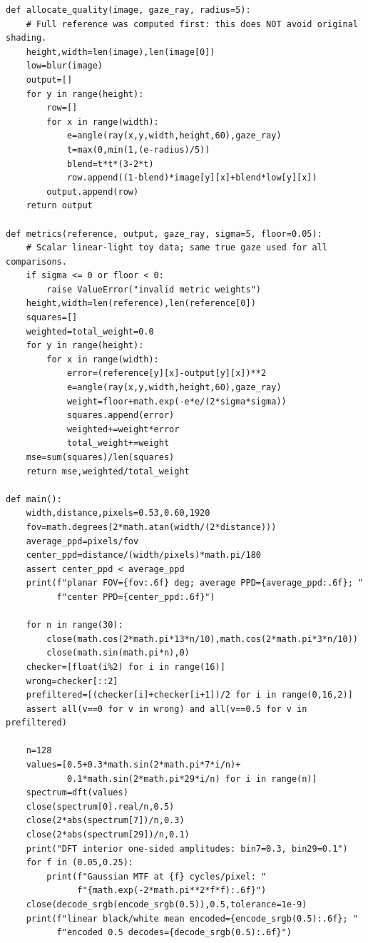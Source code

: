 \begin{verbatim}
def allocate_quality(image, gaze_ray, radius=5):
    # Full reference was computed first: this does NOT avoid original shading.
    height,width=len(image),len(image[0])
    low=blur(image)
    output=[]
    for y in range(height):
        row=[]
        for x in range(width):
            e=angle(ray(x,y,width,height,60),gaze_ray)
            t=max(0,min(1,(e-radius)/5))
            blend=t*t*(3-2*t)
            row.append((1-blend)*image[y][x]+blend*low[y][x])
        output.append(row)
    return output

def metrics(reference, output, gaze_ray, sigma=5, floor=0.05):
    # Scalar linear-light toy data; same true gaze used for all comparisons.
    if sigma <= 0 or floor < 0:
        raise ValueError("invalid metric weights")
    height,width=len(reference),len(reference[0])
    squares=[]
    weighted=total_weight=0.0
    for y in range(height):
        for x in range(width):
            error=(reference[y][x]-output[y][x])**2
            e=angle(ray(x,y,width,height,60),gaze_ray)
            weight=floor+math.exp(-e*e/(2*sigma*sigma))
            squares.append(error)
            weighted+=weight*error
            total_weight+=weight
    mse=sum(squares)/len(squares)
    return mse,weighted/total_weight

def main():
    width,distance,pixels=0.53,0.60,1920
    fov=math.degrees(2*math.atan(width/(2*distance)))
    average_ppd=pixels/fov
    center_ppd=distance/(width/pixels)*math.pi/180
    assert center_ppd < average_ppd
    print(f"planar FOV={fov:.6f} deg; average PPD={average_ppd:.6f}; "
          f"center PPD={center_ppd:.6f}")

    for n in range(30):
        close(math.cos(2*math.pi*13*n/10),math.cos(2*math.pi*3*n/10))
        close(math.sin(math.pi*n),0)
    checker=[float(i%2) for i in range(16)]
    wrong=checker[::2]
    prefiltered=[(checker[i]+checker[i+1])/2 for i in range(0,16,2)]
    assert all(v==0 for v in wrong) and all(v==0.5 for v in prefiltered)

    n=128
    values=[0.5+0.3*math.sin(2*math.pi*7*i/n)+
            0.1*math.sin(2*math.pi*29*i/n) for i in range(n)]
    spectrum=dft(values)
    close(spectrum[0].real/n,0.5)
    close(2*abs(spectrum[7])/n,0.3)
    close(2*abs(spectrum[29])/n,0.1)
    print("DFT interior one-sided amplitudes: bin7=0.3, bin29=0.1")
    for f in (0.05,0.25):
        print(f"Gaussian MTF at {f} cycles/pixel: "
              f"{math.exp(-2*math.pi**2*f*f):.6f}")
    close(decode_srgb(encode_srgb(0.5)),0.5,tolerance=1e-9)
    print(f"linear black/white mean encoded={encode_srgb(0.5):.6f}; "
          f"encoded 0.5 decodes={decode_srgb(0.5):.6f}")


\end{verbatim}
